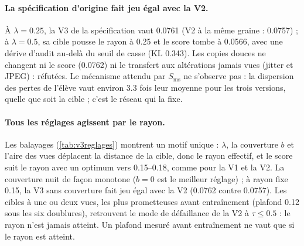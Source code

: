 \documentclass[11pt,a4paper]{article}
\begin{document}
\paragraph{La spécification d'origine fait jeu égal avec la V2.} À $\lambda=\num{0.25}$, la V3 de la
spécification vaut \num{0.0761} (V2 à la même graine : \num{0.0757}) ; à $\lambda=\num{0.5}$, sa
cible pousse le rayon à \num{0.25} et le score tombe à \num{0.0566}, avec une dérive d'audit au-delà
du seuil de casse (KL \num{0.343}). Les copies douces ne changent ni le score (\num{0.0762}) ni le
transfert aux altérations jamais vues (jitter et JPEG) : réfutées. Le mécanisme attendu par
$S_{\text{ms}}$ ne s'observe pas : la dispersion des pertes de l'élève vaut environ \num{3.3} fois
leur moyenne pour les trois versions, quelle que soit la cible ; c'est le réseau qui la fixe.

\paragraph{Tous les réglages agissent par le rayon.} Les balayages (\cref{tab:v3reglages})
montrent un motif unique : $\lambda$, la couverture $b$ et l'aire des vues déplacent la distance
de la cible, donc le rayon effectif, et le score suit le rayon avec un optimum vers
\numrange{0.15}{0.18}, comme pour la V1 et la V2. La couverture nuit de façon monotone ($b=0$ est le
meilleur réglage) ; à rayon fixe \num{0.15}, la V3 sans couverture fait jeu égal avec la V2
(\num{0.0762} contre \num{0.0757}). Les cibles à une ou deux vues, les plus prometteuses avant
entraînement (plafond \num{0.12} sous les six doublures), retrouvent le mode de défaillance de la V2
à $\tau\le\num{0.5}$ : le rayon n'est jamais atteint. Un plafond mesuré avant entraînement ne vaut
que si le rayon est atteint.
\end{document}
